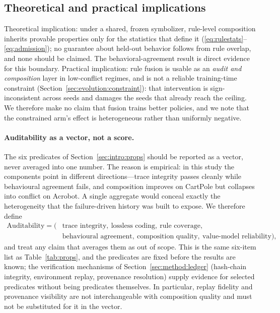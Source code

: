 \documentclass[11pt]{article}
\begin{document}
\subsection{Theoretical and practical implications}
\label{sec:discussion:implications}

Theoretical implication: under a shared, frozen symbolizer, rule-level composition inherits
provable properties only for the statistics that define it (\ref{eq:rulestats}--\ref{eq:admission});
no guarantee about held-out behavior follows from rule overlap, and none should be claimed. The
behavioral-agreement result is direct evidence for this boundary. Practical implication: rule
fusion is usable as an \emph{audit and composition} layer in low-conflict regimes, and is not a
reliable training-time constraint (Section~\ref{sec:evolution:constraint}): that intervention is
sign-inconsistent across seeds and damages the seeds that already reach the ceiling. We therefore
make no claim that fusion trains better policies, and we note that the constrained arm's effect is
heterogeneous rather than uniformly negative.

\paragraph{Auditability as a vector, not a score.}
The six predicates of Section~\ref{sec:intro:props} should be reported as a vector, never averaged into
one number. The reason is empirical: in this study the components point in different directions---trace
integrity passes cleanly while behavioural agreement fails, and composition improves on CartPole but
collapses into conflict on Acrobot. A single aggregate would conceal exactly the heterogeneity that the
failure-driven history was built to expose. We therefore define
\[
\begin{aligned}
\mathrm{Auditability} = \big(&\text{trace integrity},\ \text{lossless coding},\ \text{rule coverage},\\
&\text{behavioural agreement},\ \text{composition quality},\ \text{value-model reliability}\big),
\end{aligned}
\]
and treat any claim that averages them as out of scope. This is the same six-item list as
Table~\ref{tab:props}, and the predicates are fixed before the results are known; the
verification mechanisms of Section~\ref{sec:method:ledger} (hash-chain integrity, environment replay,
provenance resolution) supply evidence for selected predicates without being predicates themselves.
In particular, replay fidelity and provenance visibility are not interchangeable with composition
quality and must not be substituted for it in the vector.
\end{document}
